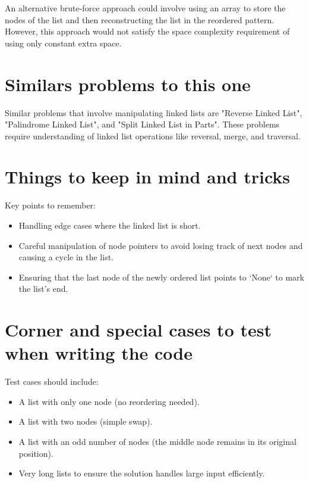 An alternative brute-force approach could involve using an array to store the nodes of the list and then reconstructing the list in the reordered pattern. However, this approach would not satisfy the space complexity requirement of using only constant extra space.

\section*{Similars problems to this one}

Similar problems that involve manipulating linked lists are "Reverse Linked List", "Palindrome Linked List", and "Split Linked List in Parts". These problems require understanding of linked list operations like reversal, merge, and traversal.

\section*{Things to keep in mind and tricks}

Key points to remember:
\begin{itemize}
    \item Handling edge cases where the linked list is short.
    \item Careful manipulation of node pointers to avoid losing track of next nodes and causing a cycle in the list.
    \item Ensuring that the last node of the newly ordered list points to `None` to mark the list's end.
\end{itemize}

\section*{Corner and special cases to test when writing the code}

Test cases should include:
\begin{itemize}
    \item A list with only one node (no reordering needed).
    \item A list with two nodes (simple swap).
    \item A list with an odd number of nodes (the middle node remains in its original position).
    \item Very long lists to ensure the solution handles large input efficiently.
\end{itemize}